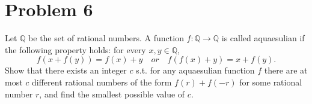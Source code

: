 \documentclass{Math_Note}
\begin{document}
\section*{Problem 6}
\begin{prb}
    Let $\mathbb{Q}$ be the set of rational numbers. A function $f: \mathbb{Q}\rightarrow\mathbb{Q}$ is called aquaesulian if the following property holds: for every $x,y\in\mathbb{Q}$, 
    \begin{equation}
        f(x+f(y))=f(x)+y \quad or \quad f(f(x)+y)=x+f(y).
    \end{equation}
    Show that there exists an integer $c$ s.t. for any aquaesulian function $f$ there are at most $c$ different rational numbers of the form $f(r)+f(-r)$ for some rational number $r$, 
    and find the smallest possible value of $c$. 
\end{prb}
\end{document}
